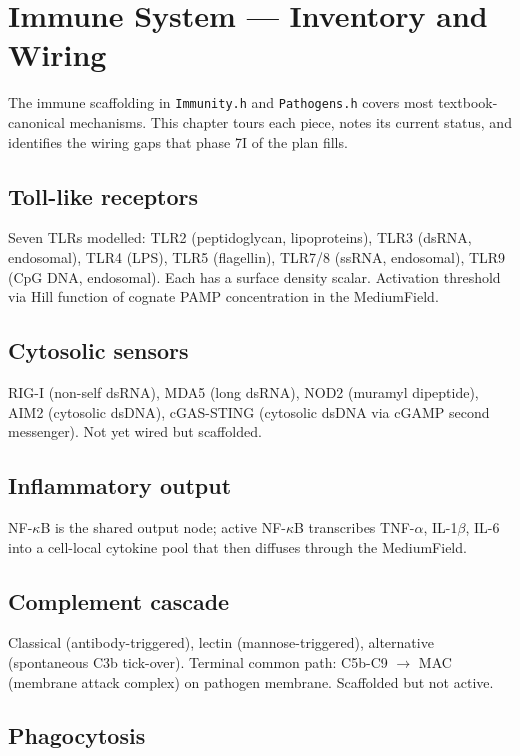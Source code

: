 \documentclass[11pt,letterpaper,twoside,openany]{book}
\newcommand{\file}[1]{\texttt{\small#1}}
\begin{document}
\chapter{Immune System --- Inventory and Wiring}
\label{ch:immunity-deep}

The immune scaffolding in \file{Immunity.h} and \file{Pathogens.h}
covers most textbook-canonical mechanisms. This chapter tours each
piece, notes its current status, and identifies the wiring gaps
that phase 7I of the plan fills.

\section{Toll-like receptors}

Seven TLRs modelled: TLR2 (peptidoglycan, lipoproteins), TLR3
(dsRNA, endosomal), TLR4 (LPS), TLR5 (flagellin), TLR7/8 (ssRNA,
endosomal), TLR9 (CpG DNA, endosomal). Each has a surface density
scalar. Activation threshold via Hill function of cognate PAMP
concentration in the MediumField.

\section{Cytosolic sensors}

RIG-I (non-self dsRNA), MDA5 (long dsRNA), NOD2 (muramyl dipeptide),
AIM2 (cytosolic dsDNA), cGAS-STING (cytosolic dsDNA via cGAMP
second messenger). Not yet wired but scaffolded.

\section{Inflammatory output}

NF-$\kappa$B is the shared output node; active NF-$\kappa$B
transcribes TNF-$\alpha$, IL-1$\beta$, IL-6 into a cell-local
cytokine pool that then diffuses through the MediumField.

\section{Complement cascade}

Classical (antibody-triggered), lectin (mannose-triggered),
alternative (spontaneous C3b tick-over). Terminal common path:
C5b-C9 $\to$ MAC (membrane attack complex) on pathogen membrane.
Scaffolded but not active.

\section{Phagocytosis}
\end{document}
